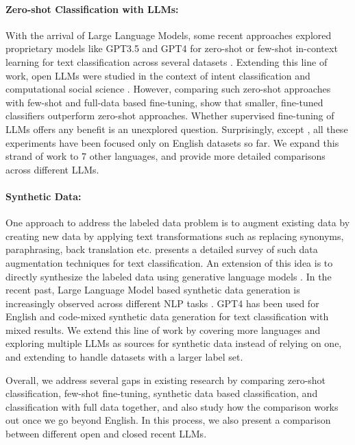 \paragraph{Zero-shot Classification with LLMs: }With the arrival of Large Language Models, some recent approaches explored proprietary models like GPT3.5 and GPT4 for zero-shot or few-shot in-context learning for text classification across several datasets \cite{ gretz2023zero,sun-etal-2023-text,mozes-etal-2023-towards,tian-chen-2024-esg}. Extending this line of work, open LLMs were studied in the context of intent classification \cite{ruan-etal-2024-large,arora-etal-2024-intent} and computational social science \cite{mu2024navigating}. However, comparing such zero-shot approaches with few-shot and full-data  based fine-tuning, \cite{edwards-camacho-collados-2024-language} show that smaller, fine-tuned classifiers outperform zero-shot approaches. Whether supervised fine-tuning of LLMs offers any benefit is an unexplored question. Surprisingly, except \citep{tian-chen-2024-esg}, all these experiments have been focused only on English datasets so far. We expand this strand of work to 7 other languages, and provide more detailed comparisons across different LLMs. 

\paragraph{Synthetic Data: } One approach to address the labeled data problem is to augment existing data by creating new data by applying text transformations such as replacing synonyms, paraphrasing, back translation etc. \citet{bayer2022survey} presents a detailed survey of such data augmentation techniques for text classification. An extension of this idea is to directly synthesize the labeled data using generative language models \cite{yu-etal-2023-regen,yue-etal-2023-synthetic,kurakin2023harnessing, choi-etal-2024-unigen}. In the recent past, Large Language Model based synthetic data generation is increasingly observed across different NLP tasks \cite{tan-etal-2024-large}. GPT4 has been used for English \cite{li2023synthetic,yamagishi-nakamura-2024-utrad,peng-etal-2024-incubating} and code-mixed \cite{zeng-2024-leveraging} synthetic data generation for text classification with mixed results. We extend this line of work by covering more languages and exploring multiple LLMs as sources for synthetic data instead of relying on one, and extending to handle datasets with a larger label set. 

Overall, we address several gaps in existing research by comparing zero-shot classification, few-shot fine-tuning, synthetic data based classification, and classification with full data together, and also study how the comparison works out once we go beyond English. In this process, we also present a comparison between different open and closed recent LLMs.
